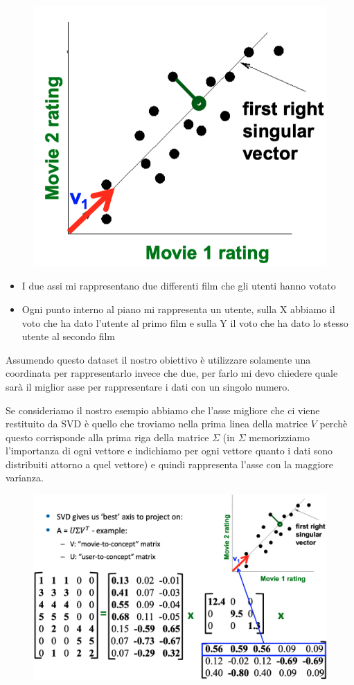 \documentclass[14pt]{extreport}
\begin{document}
\begin{figure}[H]
	\centering
	\includegraphics[width=0.7\linewidth]{503.jpeg}
\end{figure}

\begin{itemize}
	\item I due assi mi rappresentano due differenti film che gli utenti hanno votato
	\item Ogni punto interno al piano mi rappresenta un utente, sulla X abbiamo il voto che ha dato l'utente al primo film e sulla Y il voto che ha
	dato lo stesso utente al secondo film
\end{itemize}

Assumendo questo dataset il nostro obiettivo è utilizzare solamente una coordinata per rappresentarlo invece che due, per farlo mi devo chiedere quale
sarà il miglior asse per rappresentare i dati con un singolo numero.

Se consideriamo il nostro esempio abbiamo che l'asse migliore che ci viene restituito da SVD è quello che troviamo nella prima linea della matrice $V$
perchè questo corrisponde alla prima riga della matrice $\Sigma$ (in $\Sigma$ memorizziamo l'importanza di ogni vettore e indichiamo per ogni vettore
quanto i dati sono distribuiti attorno a quel vettore) e quindi rappresenta l'asse con la maggiore varianza.

\begin{figure}[H]
	\centering
	\includegraphics[width=0.7\linewidth]{504.jpeg}
\end{figure}
\end{document}

